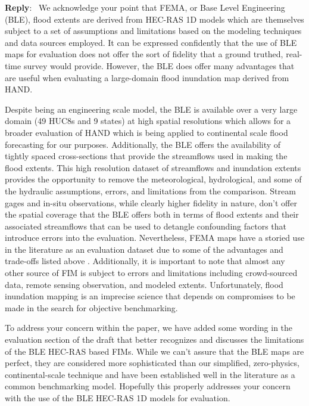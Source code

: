 \documentclass[11pt]{article}
\newcounter{reviewer}
\newcounter{point}[reviewer]
\newenvironment{reply}
   {\medskip \noindent \begin{sf}\textbf{Reply}:\  }
   {\medskip \end{sf}}
\begin{document}
\begin{reply}
We acknowledge your point that FEMA, or Base Level Engineering (BLE), flood extents are derived from HEC-RAS 1D models which are themselves subject to a set of assumptions and limitations based on the modeling techniques and data sources employed.
It can be expressed confidently that the use of BLE maps for evaluation does not offer the sort of fidelity that a ground truthed, real-time survey would provide.
However, the BLE does offer many advantages that are useful when evaluating a large-domain flood inundation map derived from HAND. 

Despite being an engineering scale model, the BLE is available over a very large domain (49 HUC8s and 9 states) at high spatial resolutions which allows for a broader evaluation of HAND which is being applied to continental scale flood forecasting for our purposes.
Additionally, the BLE offers the availability of tightly spaced cross-sections that provide the streamflows used in making the flood extents.
This high resolution dataset of streamflows and inundation extents provides the opportunity to remove the meteorological, hydrological, and some of the hydraulic assumptions, errors, and limitations from the comparison.
Stream gages and in-situ observations, while clearly higher fidelity in nature, don't offer the spatial coverage that the BLE offers both in terms of flood extents and their associated streamflows that can be used to detangle confounding factors that introduce errors into the evaluation.
Nevertheless, FEMA maps have a storied use in the literature as an evaluation dataset due to some of the advantages and trade-offs listed above \cite{cook2009effect,rajib2016large,zheng2018geoflood,afshari2018comparison,wing2017validation,criss2022stage,follum2017autorapid}.
Additionally, it is important to note that almost any other source of FIM is subject to errors and limitations including crowd-sourced data, remote sensing observation, and modeled extents.
Unfortunately, flood inundation mapping is an imprecise science that depends on compromises to be made in the search for objective benchmarking.

To address your concern within the paper, we have added some wording in the evaluation section of the draft that better recognizes and discusses the limitations of the BLE HEC-RAS based FIMs.
While we can't assure that the BLE maps are perfect, they are considered more sophisticated than our simplified, zero-physics, continental-scale technique and have been established well in the literature as a common benchmarking model.
Hopefully this properly addresses your concern with the use of the BLE HEC-RAS 1D models for evaluation.
\end{reply}
\end{document}
